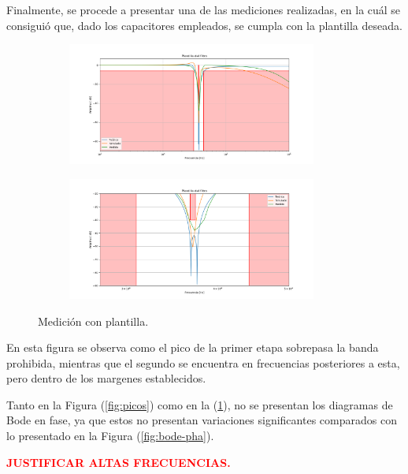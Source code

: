 Finalmente, se procede a presentar una de las mediciones realizadas, en la cuál se consiguió que, dado los capacitores empleados, se cumpla con la plantilla deseada.
\begin{figure}[H]
\centering
\begin{subfigure}{\textwidth}
\centering
	\includegraphics[width=0.9\textwidth]{ImagenesEjercicio4/Plantilla-Medida-1.png}
\end{subfigure}
\begin{subfigure}{\textwidth}
\centering
	\includegraphics[width=0.9\textwidth]{ImagenesEjercicio4/Plantilla-Medida-2.png}
\end{subfigure}
\caption{Medición con plantilla.}
\label{fig:med-plant}
\end{figure}

En esta figura se observa como el pico de la primer etapa sobrepasa la banda prohibida, mientras que el segundo se encuentra en frecuencias posteriores a esta, pero dentro de los margenes establecidos.

Tanto en la Figura (\ref{fig:picos}) como en la (\ref{fig:med-plant}), no se presentan los diagramas de Bode en fase, ya que estos no presentan variaciones significantes comparados con lo presentado en la Figura (\ref{fig:bode-pha}).

\begin{center}
	\Large{\textbf{\textcolor{red}{JUSTIFICAR ALTAS FRECUENCIAS.}}}
\end{center}


